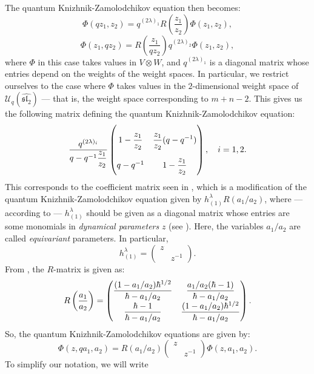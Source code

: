 \documentclass[a4paper]{report}
\theoremstyle{theorem}
\theoremstyle{definition}
\theoremstyle{remark}
\theoremstyle{proposition}
\theoremstyle{conjecture}
\theoremstyle{lemma}
\theoremstyle{corollary}
\theoremstyle{exercise}
\theoremstyle{example}
\newcommand{\mcal}{\mathcal}
\begin{document}
  The quantum Knizhnik-Zamolodchikov equation then becomes:
  $$\Phi(qz_1,z_2) = q^{(2\lambda)_1} R\left(\frac{z_1}{z_2}\right) \Phi(z_1,z_2),$$
  $$\Phi(z_1,qz_2) = R\left(\frac{z_1}{qz_2}\right)q^{(2\lambda)_2}\Phi(z_1,z_2),$$
  where $\Phi$ in this case takes values in $V\otimes W$, and 
  $q^{(2\lambda)_1}$ is a diagonal matrix whose entries depend on the weights of the 
  weight spaces. In particular,
  we restrict ourselves to the case where $\Phi$ takes values in the 
  $2$-dimensional weight space of $\mcal{U}_q(\widehat{\mathfrak{sl}_2})$ --- 
  that is, the weight space corresponding to $m+n-2$.
  This gives us the following matrix defining the 
  quantum Knizhnik-Zamolodchikov equation:
  $$\frac{q^{(2\lambda)_i}}{q-q^{-1}\displaystyle\frac{z_1}{z_2}} \renewcommand\arraystretch{2.5}\begin{pmatrix}
      1-\displaystyle\frac{z_1}{z_2} & \displaystyle\frac{z_1}{z_2}(q-q^{-1})\\
      q-q^{-1} & 1-\displaystyle\frac{z_1}{z_2}
  \end{pmatrix},\quad i =1,2.$$
  This corresponds to the coefficient matrix seen in \cite[(69)]{os22},
  which is a modification of the quantum Knizhnik-Zamolodchikov 
  equation given by
  $h_{(1)}^\lambda R(a_1/a_2)$, where --- according to \cite[(72)]{os22} --- 
  $h_{(1)}^\lambda$ should be given as a diagonal matrix whose entries 
  are some monomials in \emph{dynamical parameters} $z$ (see \cite{ao16}). Here, the variables 
  $a_1/a_2$ are called \emph{equivariant} parameters. 
  In particular, $$h_{(1)}^\lambda = \begin{pmatrix}
      z \\
      & z^{-1}
  \end{pmatrix}.$$
  From \cite[(122)]{os22}, the $R$-matrix is given as:
  $$R\left(\frac{a_1}{a_2}\right) = 
  \renewcommand\arraystretch{1.5}\begin{pmatrix}
      \displaystyle\frac{(1-a_1/a_2)\hbar^{1/2}}{\hbar - a_1/a_2} & \displaystyle\frac{a_1/a_2(\hbar - 1)}{\hbar - a_1/a_2}\\
      \displaystyle\frac{\hbar - 1}{\hbar - a_1/a_2} & \displaystyle\frac{(1-a_1/a_2)\hbar^{1/2}}{\hbar-a_1/a_2}
  \end{pmatrix}.
  $$
  So, the quantum Knizhnik-Zamolodchikov equations are given by:
  $$\Phi(z,qa_1,a_2) = R(a_1/a_2) \begin{pmatrix}
      z\\
      &z^{-1}
  \end{pmatrix} \Phi(z,a_1,a_2).$$
  To simplify our notation, we will write 
\end{document}
